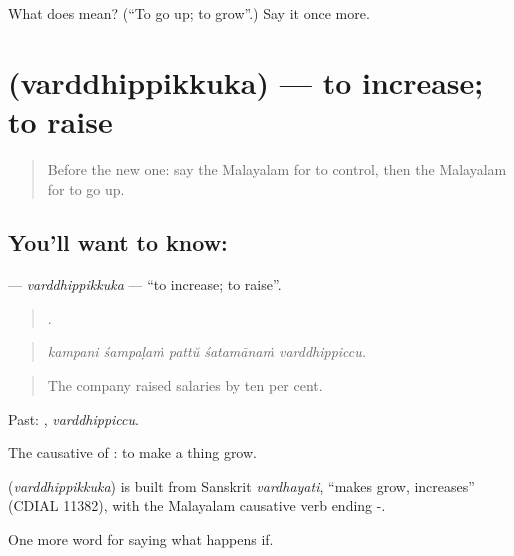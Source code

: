 \begin{tcolorbox}[breakable,colback=teal!4,colframe=teal!35!black,title={Before you move on}]
What does  mean? (\textquotedblleft{}To go up; to grow\textquotedblright{}.) Say it once more.
\end{tcolorbox}
\section[\texorpdfstring{\ml{വർദ്ധിപ്പിക്കുക} (varddhippikkuka)}{വർദ്ധിപ്പിക്കുക (varddhippikkuka)}]{ (varddhippikkuka) — to increase; to raise}

\label{lesson:ML-C449-varddhippikkuka}



\begin{quote}
Before the new one: say the Malayalam for to control, then the Malayalam for to go up.
\end{quote}

\subsection*{You'll want to know: }
\textbf{} — \emph{varddhippikkuka} — \textquotedblleft{}to increase; to raise\textquotedblright{}.

\begin{quote}
    .
\end{quote}

\begin{quote}
\emph{kampani śampaḷaṁ pattŭ śatamānaṁ varddhippiccu.}
\end{quote}

\begin{quote}
The company raised salaries by ten per cent.
\end{quote}

Past: , \emph{varddhippiccu}.

The causative of : to make a thing grow.

\begin{cousinweb}
\textbf{} (\emph{varddhippikkuka}) is built from Sanskrit \emph{vardhayati}, \textquotedblleft{}makes grow, increases\textquotedblright{} (CDIAL 11382), with the Malayalam causative verb ending -.
\end{cousinweb}

\begin{grammarlens}[title={What you've built}]
One more word for saying what happens if.
\end{grammarlens}

